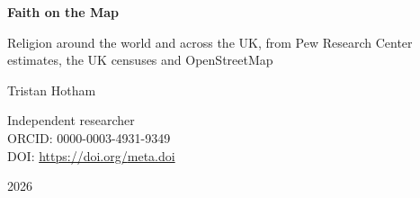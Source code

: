 \documentclass[11pt,a4paper]{article}
\begin{document}
\begin{center}
{\Large\bfseries Faith on the Map\par}
\vspace{0.4em}
{\large Religion around the world and across the UK, from Pew Research Center\\estimates, the UK censuses and OpenStreetMap\par}
\vspace{1.2em}
{\large Tristan Hotham\par}
\vspace{0.3em}
{\small Independent researcher\\
ORCID: 0000-0003-4931-9349\\
DOI: \href{https://doi.org/{{meta.doi}}}{https://doi.org/{{meta.doi}}}\par}
\vspace{0.8em}
2026
\end{center}
\end{document}
